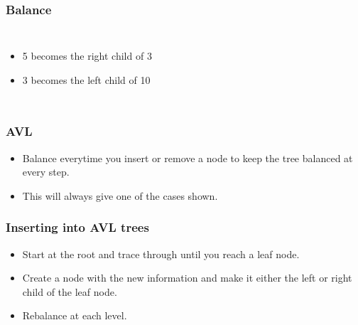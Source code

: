 \documentclass{beamer}
\begin{document}
\begin{frame}
\frametitle{Balance}
\begin{columns}
\begin{itemize}
\item 5 becomes the right child of 3 
\item 3 becomes the left child of 10
\end{itemize}


\begin{center}


\end{center}
\end{columns}
\end{frame}

\begin{frame}
\frametitle{AVL}
\begin{itemize}
\item  Balance everytime you insert or remove a node to keep the tree balanced at every step.
\item This will always give one of the cases shown.
\end{itemize}
\end{frame}

\begin{frame}
\frametitle{Inserting into AVL trees}
\begin{itemize}
\item Start at the root and trace through until you reach a leaf node.
\item Create a node with the new information and make it either the left or right child of the leaf node.
\item Rebalance at each level.
\end{itemize}
\end{frame}
\end{document}
